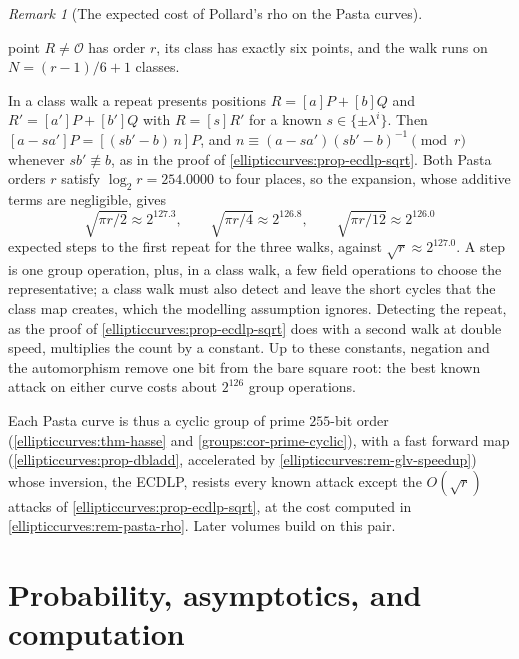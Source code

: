 \documentclass[11pt,a4paper]{article}
\theoremstyle{definition}
\theoremstyle{remark}
\newtheorem{remark}[theorem]{Remark}
\begin{document}
\begin{remark}[The expected cost of Pollard's rho on the Pasta curves]
\begin{itemize}
  point \(R \neq \mathcal O\) has order \(r\), its class has exactly six
  points, and the walk runs on \(N = (r-1)/6 + 1\) classes.
\end{itemize}
In a class walk a repeat presents positions \(R = [a]P + [b]Q\) and
\(R' = [a']P + [b']Q\) with \(R = [s]R'\) for a known
\(s \in \{\pm\lambda^i\}\). Then \([a - s a']P = [(s b' - b)\,n]P\), and
\(n \equiv (a - s a')(s b' - b)^{-1} \pmod r\) whenever
\(s b' \not\equiv b\), as in the proof of
\cref{ellipticcurves:prop-ecdlp-sqrt}. Both Pasta orders \(r\) satisfy
\(\log_2 r = 254.0000\) to four places, so the expansion, whose additive
terms are negligible, gives
\[
\sqrt{\pi r/2} \approx 2^{127.3}, \qquad
\sqrt{\pi r/4} \approx 2^{126.8}, \qquad
\sqrt{\pi r/12} \approx 2^{126.0}
\]
expected steps to the first repeat for the three walks, against
\(\sqrt r \approx 2^{127.0}\). A step is one group operation, plus, in a
class walk, a few field operations to choose the representative; a class
walk must also detect and leave the short cycles that the class map
creates, which the modelling assumption ignores. Detecting the repeat, as
the proof of \cref{ellipticcurves:prop-ecdlp-sqrt} does with a second walk
at double speed, multiplies the count by a constant. Up to these
constants, negation and the automorphism remove one bit from the bare
square root: the best known attack on either curve costs about
\(2^{126}\) group operations.
\end{remark}

Each Pasta curve is thus a cyclic group of prime \(255\)-bit order
(\cref{ellipticcurves:thm-hasse} and \cref{groups:cor-prime-cyclic}),
with a fast forward map (\cref{ellipticcurves:prop-dbladd}, accelerated
by \cref{ellipticcurves:rem-glv-speedup}) whose inversion, the ECDLP,
resists every known attack except the \(O(\sqrt{r})\) attacks of
\cref{ellipticcurves:prop-ecdlp-sqrt}, at the cost computed in
\cref{ellipticcurves:rem-pasta-rho}. Later volumes build on this pair.

\section{Probability, asymptotics, and computation}\label{sec:probability}
\end{document}
